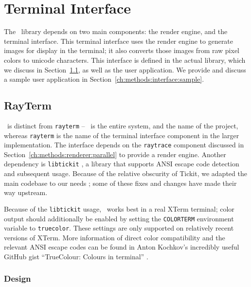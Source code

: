 \section{Terminal Interface} \label{ch:methods:interface}

The \name\ library depends on two main components: the render engine, and the terminal interface.
This terminal interface uses the render engine to generate images for display in the terminal; it also converts those images from raw pixel colors to unicode characters.
This interface is defined in the actual library, which we discuss in Section~\ref{ch:methods:interface:rayterm}, as well as the user application.
We provide and discuss a sample user application in Section~\ref{ch:methods:interface:sample}.

\subsection{RayTerm} \label{ch:methods:interface:rayterm}

\name\ is distinct from \texttt{rayterm} -- \name\ is the entire system, and the name of the project, whereas \texttt{rayterm} is the name of the terminal interface component in the larger implementation.
The interface depends on the \texttt{raytrace} component discussed in Section~\ref{ch:methods:renderer:parallel} to provide a render engine.
Another dependency is \texttt{libtickit} \cite{libtickitLibrary}, a library that supports ANSI escape code detection and subsequent usage.
Because of the relative obscurity of Tickit, we adapted the main codebase to our needs \cite{libtickitCustom}; some of these fixes and changes have made their way upstream.

Because of the \texttt{libtickit} usage, \name\ works best in a real XTerm terminal; color output should additionally be enabled by setting the \texttt{COLORTERM} environment variable to \texttt{truecolor}.
These settings are only supported on relatively recent versions of XTerm.
More information of direct color compatibility and the relevant ANSI escape codes can be found in Anton Kochkov's incredibly useful GitHub gist ``TrueColour: Colours in terminal'' \cite{kochkov2019colours}.

\subsubsection{Design} \label{ch:methods:interface:tickit:design}

